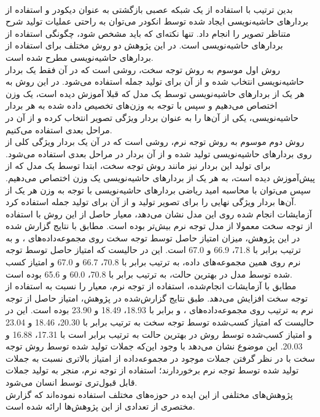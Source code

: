 \\
بدین ترتیب با استفاده از یک شبکه عصبی بازگشتی به عنوان دیکودر و استفاده از بردارهای حاشیه‌نویسی ایجاد شده توسط انکودر می‌توان به راحتی عملیات تولید شرح متناظر تصویر را انجام داد. تنها نکته‌ای که باید مشخص شود، چگونگی استفاده از بردارهای حاشیه‌نویسی است. در این پژوهش دو روش مختلف برای استفاده از بردارهای حاشیه‌نویسی مطرح شده است.
\\
روش اول موسوم به روش توجه سخت، روشی است که در آن فقط یک بردار حاشیه‌نویسی انتخاب شده و از آن برای تولید جمله استفاده می‌شود. در این روش به هر یک از بردارهای حاشیه‌نویسی توسط یک مدل که قبلا آموزش دیده است، یک وزن اختصاص می‌دهیم و سپس با توجه به وزن‌های تخصیص داده شده به هر بردار حاشیه‌نویسی، یکی از آن‌ها را به عنوان بردار ویژگی تصویر انتخاب کرده و از آن در مراحل بعدی استفاده می‌کنیم.
\\
روش دوم موسوم به روش توجه نرم، روشی است که در آن یک بردار ویژگی کلی از روی بردارهای حاشیه‌نویسی تولید شده و از آن بردار در مراحل بعدی استفاده می‌شود. برای تولید این بردار نیز مانند روش توجه سخت، ابتدا توسط یک مدل که از پیش‌آموزش دیده است، به هر یک از بردارهای حاشیه‌نویسی یک وزن اختصاص می‌دهیم. سپس می‌توان با محاسبه امید ریاضی بردارهای حاشیه‌نویسی با توجه به وزن هر یک از آن‌ها بردار ویژگی نهایی را برای تصویر تولید و از آن برای تولید جمله استفاده کرد.
\\
آزمایشات انجام شده روی این مدل نشان می‌دهد، معیار  حاصل از این روش با استفاده از توجه سخت معمولا از مدل توجه نرم بیش‌تر بوده است. مطابق با نتایج گزارش شده در این پژوهش، میزان امتیاز  حاصل توسط توجه سخت روی مجموعه‌داده‌های ،   و  به ترتیب برابر با 71.8، 66.9 و 67.0 است. این در حالیست که امتیاز حاصل توسط توجه نرم روی همین مجموعه‌های داده، به ترتیب برابر با 70.8، 66.7 و 67.0 و امتیاز کسب شده توسط مدل  در بهترین حالت، به ترتیب برابر با 70.8، 60.0 و 65.6 بوده است. 
\\
مطابق با آزمایشات انجام‌شده، استفاده از توجه نرم، معیار  را نسبت به استفاده از توجه سخت افزایش می‌دهد. طبق نتایج گزارش‌شده در پژوهش، امتیاز  حاصل از توجه نرم به ترتیب روی مجموعه‌داده‌های ،  و  برابر با 18.93، 18.49 و 23.90 بوده است. این در حالیست که امتیاز کسب‌شده توسط توجه سخت به ترتیب برابر با 20.30، 18.46 و 23.04 و امتیاز کسب‌شده توسط روش  در بهترین حالت به ترتیب برابر است با 17.31، 16.88 و 20.03. این موضوع نشان می‌دهد با وجود این‌که جملات تولید شده توسط روش توجه سخت با در نظر گرفتن جملات موجود در مجموعه‌داده از امتیاز بالاتری نسبت به جملات تولید شده توسط توجه نرم برخوردارند؛ استفاده از توجه نرم، منجر به تولید جملات قابل قبول‌تری توسط انسان می‌شود.
\\
پژوهش‌های مختلفی از این ایده در حوزه‌های مختلف استفاده نموده‌اند که گزارش مختصری از تعدادی از این پژوهش‌ها ارائه شده است.

